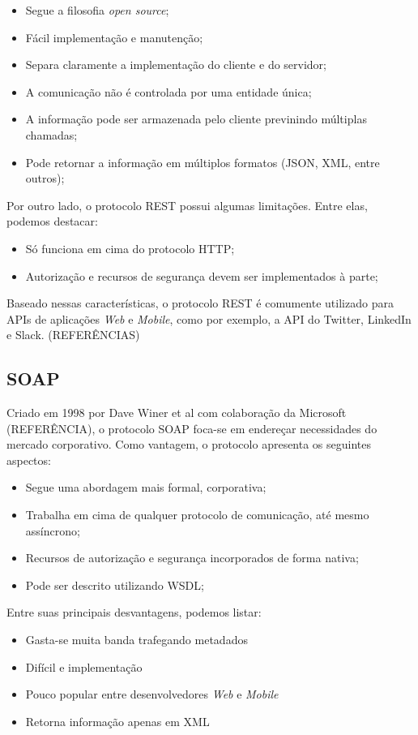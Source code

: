 \begin{itemize}
\item Segue a filosofia \textit{open source};
\item Fácil implementação e manutenção;
\item Separa claramente a implementação do cliente e do servidor;
\item A comunicação não é controlada por uma entidade única;
\item A informação pode ser armazenada pelo cliente previnindo múltiplas chamadas;
\item Pode retornar a informação em múltiplos formatos (JSON, XML, entre outros);
\end{itemize}

Por outro lado, o protocolo REST possui algumas limitações. Entre elas, podemos destacar:

\begin{itemize}
	\item Só funciona em cima do protocolo HTTP;
	\item Autorização e recursos de segurança devem ser implementados à parte;
\end{itemize}

Baseado nessas características, o protocolo REST é comumente utilizado para APIs de aplicações \textit{Web} e \textit{Mobile}, como por exemplo, a API do Twitter, LinkedIn e Slack. (REFERÊNCIAS)

\subsection{SOAP}
Criado em 1998 por Dave Winer et al com colaboração da Microsoft (REFERÊNCIA), o protocolo SOAP foca-se em endereçar necessidades do mercado corporativo. Como vantagem, o protocolo apresenta os seguintes aspectos:

\begin{itemize}
	\item Segue uma abordagem mais formal, corporativa;
	\item Trabalha em cima de qualquer protocolo de comunicação, até mesmo assíncrono;
	\item Recursos de autorização e segurança incorporados de forma nativa;
	\item Pode ser descrito utilizando WSDL;
\end{itemize}

Entre suas principais desvantagens, podemos listar:

\begin{itemize}
	\item Gasta-se muita banda trafegando metadados
	\item Difícil e implementação
	\item Pouco popular entre desenvolvedores \textit{Web} e \textit{Mobile}
	\item Retorna informação apenas em XML
\end{itemize}

